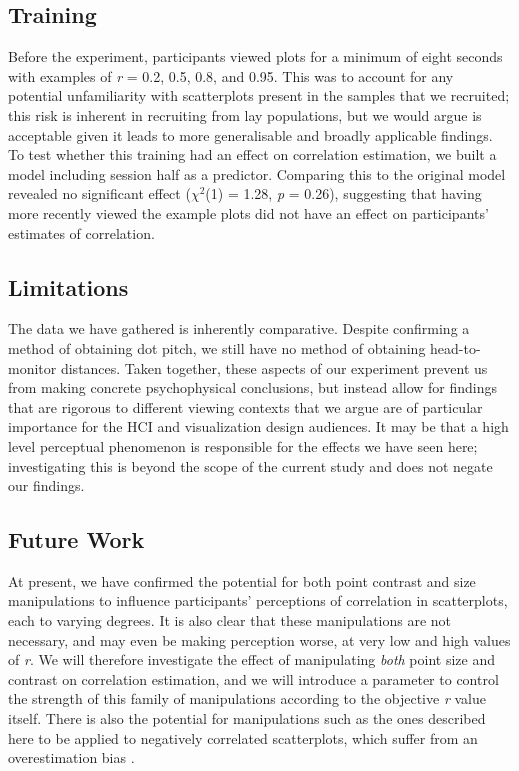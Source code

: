 \documentclass{vgtc}                          %
\begin{document}
\hypertarget{training}{%
\subsection{Training}\label{training}}

Before the experiment, participants viewed plots for a minimum of
eight seconds with examples of \emph{r} = 0.2, 0.5, 0.8, and 0.95. This was to account
for any potential unfamiliarity with scatterplots present in the samples
that we recruited; this risk is inherent in recruiting from lay populations, but we
would argue is acceptable given it leads to more generalisable and broadly
applicable findings. To test whether this training had an effect on correlation estimation,
we built a model including session half as a predictor. Comparing this
to the original model revealed no significant effect (\(\chi^2\)(1)
= 1.28, \emph{p} = 0.26),
suggesting that having more recently viewed the example plots did not have an effect
on participants' estimates of correlation.

\hypertarget{limitations}{%
\subsection{Limitations}\label{limitations}}

The data we have gathered is inherently comparative.
Despite confirming a method of obtaining dot pitch, we still have no method of obtaining
head-to-monitor distances. Taken together, these aspects of our experiment prevent us
from making concrete psychophysical conclusions,
but instead allow for findings that are rigorous to different viewing contexts
that we argue are of particular importance for the HCI and visualization design audiences. It
may be that a high level perceptual phenomenon is responsible for the effects
we have seen here; investigating this is beyond the scope of the current study and
does not negate our findings.

\hypertarget{future-work}{%
\subsection{Future Work}\label{future-work}}

At present, we have confirmed the potential for both point contrast and size
manipulations to influence participants' perceptions of correlation in scatterplots,
each to varying degrees. It is also clear that these manipulations are not necessary,
and may even be making perception worse, at very low and high values of \emph{r}. We will therefore
investigate the effect of manipulating \emph{both} point size and contrast on correlation estimation, and we will introduce a
parameter to control the strength of this family of manipulations according to the
objective \emph{r} value itself. There is also the potential for manipulations
such as the ones described here to be applied to negatively correlated scatterplots,
which suffer from an overestimation bias \cite{sher_2017}.
\end{document}
